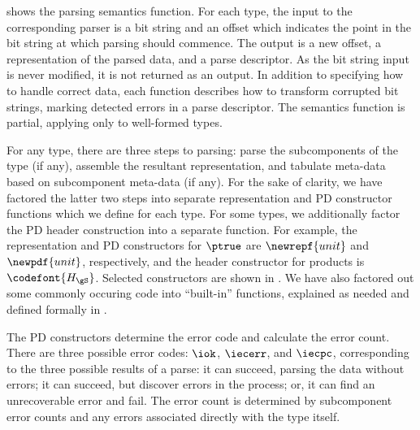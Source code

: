 shows the parsing semantics function.  For each
type, the input to the corresponding parser is a bit string and an
offset which indicates the point in the bit string at which parsing
should commence.  The output is a new offset, a representation of the
parsed data, and a parse descriptor. As the bit string input is
never modified, it is not returned as an output.  In addition
to specifying how to handle correct data, each function describes how
to transform corrupted bit strings, marking detected errors in
a parse descriptor. The semantics function is partial, applying only
to well-formed \ddc{} types.

For any type, there are three steps to parsing: parse the
subcomponents of the type (if any), assemble the resultant representation, and
tabulate meta-data based on subcomponent meta-data
(if any). For the sake of clarity, we have factored the latter two
steps into separate representation and PD constructor functions which we define for
each type. For some types, we additionally factor the PD header
construction into a separate function. For example, the representation 
and PD constructors for $\ptrue$ are $\newrepf {unit}$ and $\newpdf
{unit}$, respectively, and the header constructor for products is
${\codefont{H_{\gS}}}$. Selected constructors are shown in
. We have also factored out some commonly
occuring code into ``built-in'' functions, explained as needed and
defined formally in .

The PD constructors determine the error code and
calculate the error count.  There are three possible error codes:
$\iok$, $\iecerr$, and $\iecpc$, corresponding to the three possible results of a parse: 
it can succeed, parsing the data without errors; it can succeed,
but discover errors in the process; or, it can find an
unrecoverable error and fail.
The error count is determined by subcomponent error counts and any errors associated directly with the type
itself.  

